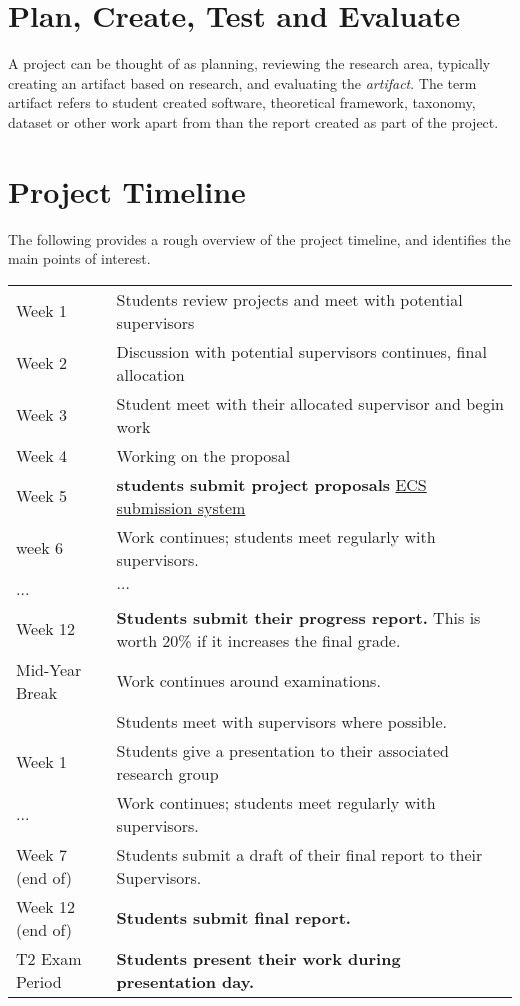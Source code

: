 \section{Plan, Create, Test and Evaluate}

A project can be thought of as planning, reviewing the research area, typically creating an artifact based on research,
and evaluating the {\em artifact}.  The term artifact
refers to student created software, theoretical framework, taxonomy, dataset or other work apart from than the report created as part of the project. 

\pagebreak
\section{Project Timeline}
The following provides a rough overview of the project timeline, and identifies the main points of interest.
\begin{center}
\begin{tabular}{|l|p{10cm}|}
\hline
Week 1 & Students review projects and meet with potential supervisors\\
Week 2 & Discussion with potential supervisors continues, final allocation\\
Week 3 & Student meet with their allocated supervisor and begin work\\
Week 4 & Working on the proposal \\
Week 5 & \textbf{ students submit project proposals} \href{https://apps.ecs.vuw.ac.nz/submit/COMP489}{ECS submission system}\\
week 6 & Work continues; students meet regularly with supervisors.\\
...&  $\ldots$\\
Week 12 & \textbf{Students submit their progress report.} This is worth 20\% if it increases the final grade.\\
\hline
\hline
Mid-Year Break& Work continues around examinations.\\
&Students meet with supervisors where possible.\\
\hline
\hline
Week 1 & {Students give a presentation to their associated research group}\\
...    & Work continues; students meet regularly with supervisors.\\
Week 7 (end of)& {Students submit a draft of their final report to their Supervisors.}\\
Week 12 (end of)& \textbf{Students submit final report.}\\
\hline
\hline
T2 Exam Period & \textbf{Students present their work during presentation day.}\\
\hline
\end{tabular}
\end{center}
